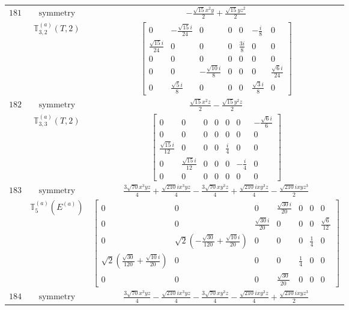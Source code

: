 \documentclass[fleqn,8pt,landscape]{jsarticle}
\begin{document}
\begin{longtable}{ccc}
$ 181 $ & $ \text{symmetry} $ & $ - \frac{\sqrt{15} x^{2} y}{2} + \frac{\sqrt{15} y z^{2}}{2} $ \\
$  $ & $ \mathbb{T}_{3,2}^{(a)}(T,2) $ & $ \begin{bmatrix} 0 & - \frac{\sqrt{15} i}{24} & 0 & 0 & 0 & - \frac{i}{8} & 0 \\ \frac{\sqrt{15} i}{24} & 0 & 0 & 0 & \frac{3 i}{8} & 0 & 0 \\ 0 & 0 & 0 & 0 & 0 & 0 & 0 \\ 0 & 0 & - \frac{\sqrt{10} i}{8} & 0 & 0 & 0 & \frac{\sqrt{6} i}{24} \\ 0 & \frac{\sqrt{5} i}{8} & 0 & 0 & 0 & \frac{\sqrt{3} i}{8} & 0 \end{bmatrix} $ \\ \hline
$ 182 $ & $ \text{symmetry} $ & $ \frac{\sqrt{15} x^{2} z}{2} - \frac{\sqrt{15} y^{2} z}{2} $ \\
$  $ & $ \mathbb{T}_{3,3}^{(a)}(T,2) $ & $ \begin{bmatrix} 0 & 0 & 0 & 0 & 0 & 0 & - \frac{\sqrt{6} i}{6} \\ 0 & 0 & 0 & 0 & 0 & 0 & 0 \\ \frac{\sqrt{15} i}{12} & 0 & 0 & 0 & \frac{i}{4} & 0 & 0 \\ 0 & \frac{\sqrt{15} i}{12} & 0 & 0 & 0 & - \frac{i}{4} & 0 \\ 0 & 0 & 0 & 0 & 0 & 0 & 0 \end{bmatrix} $ \\ \hline
$ 183 $ & $ \text{symmetry} $ & $ \frac{3 \sqrt{70} x^{3} y z}{4} + \frac{\sqrt{210} i x^{3} y z}{4} - \frac{3 \sqrt{70} x y^{3} z}{4} + \frac{\sqrt{210} i x y^{3} z}{4} - \frac{\sqrt{210} i x y z^{3}}{2} $ \\
$  $ & $ \mathbb{T}_{5}^{(a)}(E^{(a)}) $ & $ \begin{bmatrix} 0 & 0 & 0 & \frac{\sqrt{30} i}{20} & 0 & 0 & 0 \\ 0 & 0 & \frac{\sqrt{30} i}{20} & 0 & 0 & 0 & \frac{\sqrt{6}}{12} \\ 0 & \sqrt{2} \left(- \frac{\sqrt{30}}{120} + \frac{\sqrt{10} i}{20}\right) & 0 & 0 & 0 & \frac{1}{4} & 0 \\ \sqrt{2} \left(\frac{\sqrt{30}}{120} + \frac{\sqrt{10} i}{20}\right) & 0 & 0 & 0 & \frac{1}{4} & 0 & 0 \\ 0 & 0 & 0 & \frac{\sqrt{30}}{20} & 0 & 0 & 0 \end{bmatrix} $ \\ \hline
$ 184 $ & $ \text{symmetry} $ & $ \frac{3 \sqrt{70} x^{3} y z}{4} - \frac{\sqrt{210} i x^{3} y z}{4} - \frac{3 \sqrt{70} x y^{3} z}{4} - \frac{\sqrt{210} i x y^{3} z}{4} + \frac{\sqrt{210} i x y z^{3}}{2} $ \\

\end{longtable}
\end{document}
